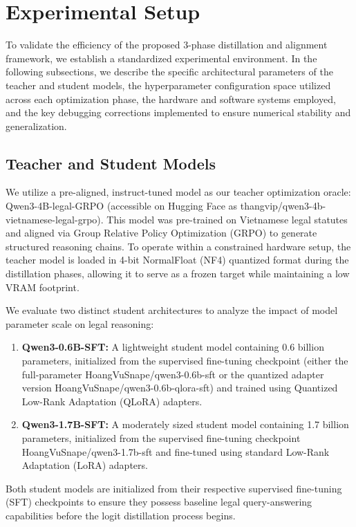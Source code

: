 \section{Experimental Setup}

To validate the efficiency of the proposed 3-phase distillation and alignment framework, we establish a standardized experimental environment. In the following subsections, we describe the specific architectural parameters of the teacher and student models, the hyperparameter configuration space utilized across each optimization phase, the hardware and software systems employed, and the key debugging corrections implemented to ensure numerical stability and generalization.

\subsection{Teacher and Student Models}

We utilize a pre-aligned, instruct-tuned model as our teacher optimization oracle: Qwen3-4B-legal-GRPO (accessible on Hugging Face as thangvip/qwen3-4b-vietnamese-legal-grpo). This model was pre-trained on Vietnamese legal statutes and aligned via Group Relative Policy Optimization (GRPO) to generate structured reasoning chains. To operate within a constrained hardware setup, the teacher model is loaded in 4-bit NormalFloat (NF4) quantized format during the distillation phases, allowing it to serve as a frozen target while maintaining a low VRAM footprint.

We evaluate two distinct student architectures to analyze the impact of model parameter scale on legal reasoning:
\begin{enumerate}
    \item \textbf{Qwen3-0.6B-SFT:} A lightweight student model containing 0.6 billion parameters, initialized from the supervised fine-tuning checkpoint (either the full-parameter HoangVuSnape/qwen3-0.6b-sft or the quantized adapter version HoangVuSnape/qwen3-0.6b-qlora-sft) and trained using Quantized Low-Rank Adaptation (QLoRA) adapters.
    \item \textbf{Qwen3-1.7B-SFT:} A moderately sized student model containing 1.7 billion parameters, initialized from the supervised fine-tuning checkpoint HoangVuSnape/qwen3-1.7b-sft and fine-tuned using standard Low-Rank Adaptation (LoRA) adapters.
\end{enumerate}

Both student models are initialized from their respective supervised fine-tuning (SFT) checkpoints to ensure they possess baseline legal query-answering capabilities before the logit distillation process begins.

